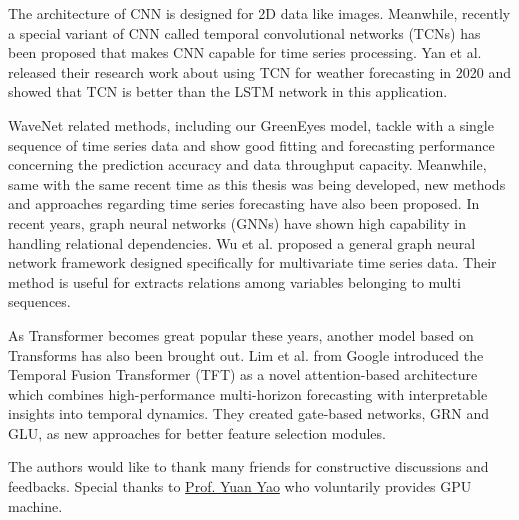 \documentclass[sigconf]{acmart}
\begin{document}
The architecture of CNN is designed for 2D data like images. Meanwhile, recently a special variant of CNN called temporal convolutional networks (TCNs) \cite{lea2016temporal} has been proposed that makes CNN capable for time series processing. Yan et al. \cite{yan2020temporal} released their research work about using TCN for weather forecasting in 2020 and showed that TCN is better than the LSTM network in this application.

WaveNet related methods, including our GreenEyes model, tackle with a single sequence of time series data and show good fitting and forecasting performance concerning the prediction accuracy and data throughput capacity. Meanwhile, same with the same recent time as this thesis was being developed, new methods and approaches regarding time series forecasting have also been proposed. In recent years, graph neural networks (GNNs) have shown high capability in handling relational dependencies. Wu et al. \cite{wu2020connecting} proposed a general graph neural network framework designed specifically for multivariate time series data. Their method is useful for extracts relations among variables belonging to multi sequences.

As Transformer \cite{vaswani2017attention} becomes great popular these years, another model based on Transforms has also been brought out. Lim et al. \cite{lim2021temporal} from Google introduced the Temporal Fusion Transformer (TFT) as a novel attention-based architecture which combines high-performance multi-horizon forecasting with interpretable insights into temporal dynamics. They created gate-based networks, GRN and GLU, as new approaches for better feature selection modules.

\begin{acks}
The authors would like to thank many friends for constructive discussions and feedbacks. Special thanks to \href{https://www.math.hkust.edu.hk/people/faculty/profile/yuany/}{Prof. Yuan Yao} who voluntarily provides GPU machine.
\end{acks}



\end{document}
